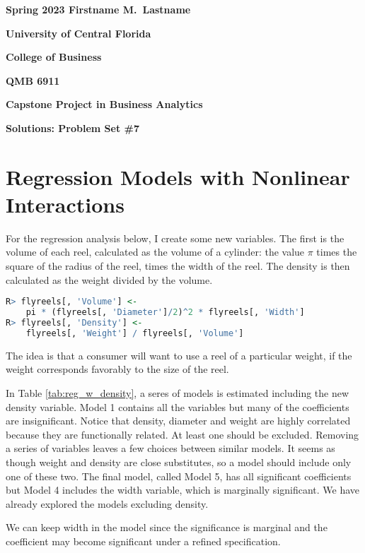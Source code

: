 \documentclass[11pt]{paper}
\begin{document}

\pagestyle{empty}
{\noindent\bf Spring 2023 \hfill Firstname M.~Lastname}
\vskip 16pt
\centerline{\bf University of Central Florida}
\centerline{\bf College of Business}
\vskip 16pt
\centerline{\bf QMB 6911}
\centerline{\bf Capstone Project in Business Analytics}
\vskip 10pt
\centerline{\bf Solutions:  Problem Set \#7}
\vskip 32pt
\noindent

\section{Regression Models with Nonlinear Interactions}


For the regression analysis below, I create some new variables.
The first is the volume of each reel, 
calculated as the volume of a cylinder: 
the value $\pi$ times the square of the radius of the reel,
times the width of the reel. 
The density is then calculated as the weight 
divided by the volume. 

\begin{lstlisting}[language=R]
R> flyreels[, 'Volume'] <- 
	pi * (flyreels[, 'Diameter']/2)^2 * flyreels[, 'Width']
R> flyreels[, 'Density'] <- 
	flyreels[, 'Weight'] / flyreels[, 'Volume']
\end{lstlisting}

The idea is that a consumer will want to use a reel of a 
particular weight, if the weight corresponds favorably to the size of the reel.



In Table \ref{tab:reg_w_density}, 
a seres of models is estimated including the new density variable.
Model 1 contains all the variables but many of the coefficients are insignificant.
Notice that density, diameter and weight are highly
correlated because they are functionally related.
At least one should be excluded.
Removing a series of variables leaves a few choices
between similar models.
It seems as though weight and density are close substitutes, 
so a model should include only one of these two.
The final model, called Model 5, has all significant coefficients
but Model 4 includes the width variable, which is marginally significant.
We have already explored the models excluding density. 

We can keep width in the model since the significance is marginal 
and the coefficient may become significant under a refined specification.
\end{document}
